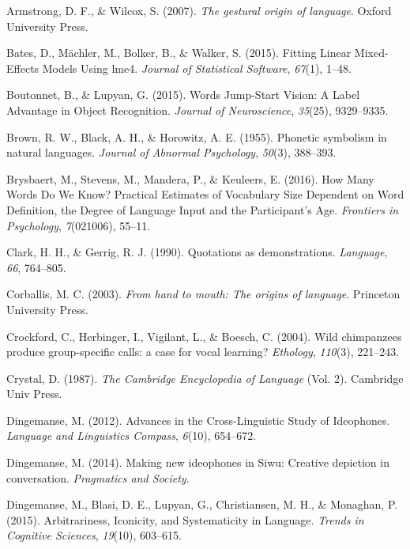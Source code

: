 \documentclass[english,floatsintext,man]{apa6}
\theoremstyle{definition}
\theoremstyle{definition}
\theoremstyle{definition}
\theoremstyle{remark}
\begin{document}
\leavevmode\hypertarget{ref-Armstrong:2007go}{}%
Armstrong, D. F., \& Wilcox, S. (2007). \emph{The gestural origin of
language}. Oxford University Press.

\leavevmode\hypertarget{ref-lme4:2015}{}%
Bates, D., Mächler, M., Bolker, B., \& Walker, S. (2015). Fitting Linear
Mixed-Effects Models Using lme4. \emph{Journal of Statistical Software},
\emph{67}(1), 1--48.

\leavevmode\hypertarget{ref-Boutonnet:2015fz}{}%
Boutonnet, B., \& Lupyan, G. (2015). Words Jump-Start Vision: A Label
Advantage in Object Recognition. \emph{Journal of Neuroscience},
\emph{35}(25), 9329--9335.

\leavevmode\hypertarget{ref-Brown:1955wy}{}%
Brown, R. W., Black, A. H., \& Horowitz, A. E. (1955). Phonetic
symbolism in natural languages. \emph{Journal of Abnormal Psychology},
\emph{50}(3), 388--393.

\leavevmode\hypertarget{ref-Brysbaert:2016fg}{}%
Brysbaert, M., Stevens, M., Mandera, P., \& Keuleers, E. (2016). How
Many Words Do We Know? Practical Estimates of Vocabulary Size Dependent
on Word Definition, the Degree of Language Input and the Participant's
Age. \emph{Frontiers in Psychology}, \emph{7}(021006), 55--11.

\leavevmode\hypertarget{ref-Clark:1990cl}{}%
Clark, H. H., \& Gerrig, R. J. (1990). Quotations as demonstrations.
\emph{Language}, \emph{66}, 764--805.

\leavevmode\hypertarget{ref-Corballis:2003ha}{}%
Corballis, M. C. (2003). \emph{From hand to mouth: The origins of
language}. Princeton University Press.

\leavevmode\hypertarget{ref-Crockford:2004cz}{}%
Crockford, C., Herbinger, I., Vigilant, L., \& Boesch, C. (2004). Wild
chimpanzees produce group-specific calls: a case for vocal learning?
\emph{Ethology}, \emph{110}(3), 221--243.

\leavevmode\hypertarget{ref-Crystal:1987en}{}%
Crystal, D. (1987). \emph{The Cambridge Encyclopedia of Language} (Vol.
2). Cambridge Univ Press.

\leavevmode\hypertarget{ref-Dingemanse:2012fc}{}%
Dingemanse, M. (2012). Advances in the Cross-Linguistic Study of
Ideophones. \emph{Language and Linguistics Compass}, \emph{6}(10),
654--672.

\leavevmode\hypertarget{ref-Dingemanse:2014gj}{}%
Dingemanse, M. (2014). Making new ideophones in Siwu: Creative depiction
in conversation. \emph{Pragmatics and Society}.

\leavevmode\hypertarget{ref-Dingemanse:2015cu}{}%
Dingemanse, M., Blasi, D. E., Lupyan, G., Christiansen, M. H., \&
Monaghan, P. (2015). Arbitrariness, Iconicity, and Systematicity in
Language. \emph{Trends in Cognitive Sciences}, \emph{19}(10), 603--615.
\end{document}

